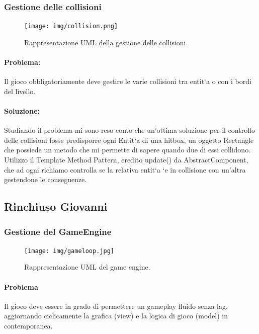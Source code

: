 \subsubsection{Gestione delle collisioni}

\begin{figure}[H]
\centering{}
\texttt{[image: img/collision.png]}
\caption{Rappresentazione UML della gestione delle collisioni.}
\end{figure}

\paragraph{Problema:}
Il gioco obbligatoriamente deve gestire le varie collisioni tra entit`a o con i bordi del livello.

\paragraph{Soluzione:}
Studiando il problema mi sono reso conto che un’ottima soluzione per il controllo delle collisioni fosse predisporre ogni Entit`a di una hitbox, un oggetto Rectangle che possiede un metodo che mi permette di sapere quando due di essi collidono. Utilizzo il Template Method Pattern, eredito update() da AbstractComponent, che ad ogni richiamo controlla se la relativa entit`a `e in collisione con un’altra gestendone le conseguenze.






\subsection{Rinchiuso Giovanni}

\subsubsection{Gestione del GameEngine}

\begin{figure}[H]
\centering{}
\texttt{[image: img/gameloop.jpg]}
\caption{Rappresentazione UML del game engine.}
\end{figure}

\paragraph{Problema} Il gioco deve essere in grado di permettere un gameplay fluido senza lag, aggiornando ciclicamente la grafica (view) e la logica di gioco (model) in contemporanea.

